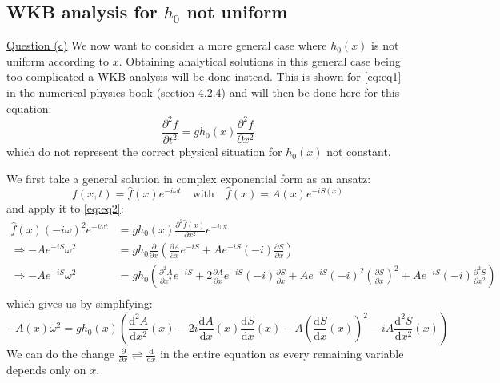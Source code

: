 \subsection{WKB analysis for $h_0$ not uniform}
\underline{Question (c)}
We now want to consider a more general case where $h_0(x)$ is not uniform according to $x$. Obtaining analytical solutions in this general case being too complicated a WKB analysis will be done instead. This is shown for \autoref{eq:eq1} in the numerical physics book \cite{physnumbook} (section 4.2.4) and will then be done here for this equation:
\begin{equation}
    \frac{\partial^2 f}{\partial t^2} = g h_0(x) \frac{\partial^2 f}{\partial x^2}
    \label{eq:eq2}
\end{equation}
which do not represent the correct physical situation for $h_0(x)$ not constant.

We first take a general solution in complex exponential form as an ansatz:
\begin{equation}
    f(x,t) = \hat{f}(x)e^{-i\omega t} \quad \mathrm{with} \quad
    \hat{f}(x) = A(x)e^{-iS(x)}
    \label{eq:ansatz}
\end{equation}
and apply it to \autoref{eq:eq2}:
\[
    \begin{aligned}
        \hat{f}(x)(-i\omega)^2e^{-i\omega t} &= gh_0(x)\frac{\partial^2 \hat{f}(x)}{\partial x^2} e^{-i\omega t} \\
        \Rightarrow -Ae^{-iS}\omega^2 &= gh_0 \frac{\partial}{\partial x}\left(\frac{\partial A}{\partial x}e^{-iS} + Ae^{-iS}(-i)\frac{\partial S}{\partial x}\right) \\
        \Rightarrow -Ae^{-iS}\omega^2 &= gh_0 \left(\frac{\partial^2 A}{\partial x^2}e^{-iS} + 2 \frac{\partial A}{\partial x}e^{-iS}(-i)\frac{\partial S}{\partial x} + Ae^{-iS}(-i)^2\left(\frac{\partial S}{\partial x}\right)^2 + Ae^{-iS}(-i)\frac{\partial^2 S}{\partial x^2} \right) \\
    \end{aligned}    
\]
which gives us by simplifying:
\begin{equation}
    -A(x)\omega^2 = gh_0(x)\left(\frac{\mathrm{d}^2 A}{\mathrm{d} x^2}(x) - 2i \frac{\mathrm{d} A}{\mathrm{d} x}(x)\frac{\mathrm{d} S}{\mathrm{d} x}(x) - A\left(\frac{\mathrm{d} S}{\mathrm{d} x}(x)\right)^2 - iA\frac{\mathrm{d}^2 S}{\mathrm{d} x^2}(x)\right)
    \label{eq:equation_exponential_wkb}
\end{equation}
We can do the change $\frac{\partial}{\partial x} \rightleftharpoons \frac{\mathrm{d}}{\mathrm{d}x}$ in the entire equation as every remaining variable depends only on $x$.

